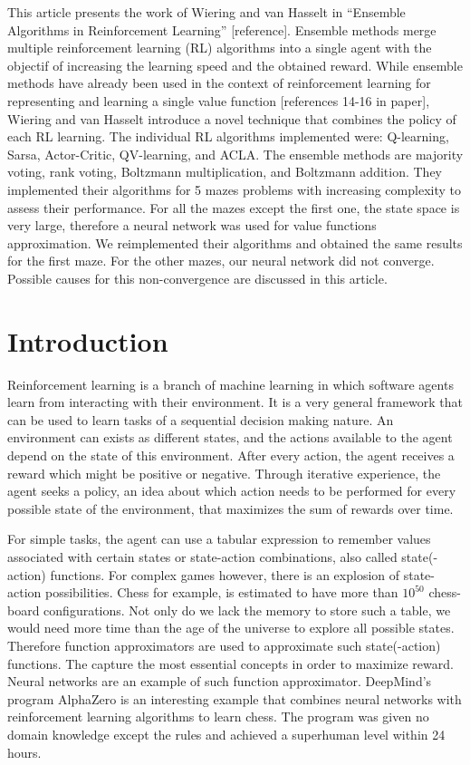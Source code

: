 This article presents the work of Wiering and van Hasselt in ``Ensemble
Algorithms in Reinforcement Learning'' {[}reference{]}. Ensemble methods
merge multiple reinforcement learning (RL) algorithms into a single
agent with the objectif of increasing the learning speed and the
obtained reward. While ensemble methods have already been used in the
context of reinforcement learning for representing and learning a single
value function {[}references 14-16 in paper{]}, Wiering and van Hasselt
introduce a novel technique that combines the policy of each RL
learning. The individual RL algorithms implemented were: Q-learning,
Sarsa, Actor-Critic, QV-learning, and ACLA. The ensemble methods are
majority voting, rank voting, Boltzmann multiplication, and Boltzmann
addition. They implemented their algorithms for 5 mazes problems with
increasing complexity to assess their performance. For all the mazes
except the first one, the state space is very large, therefore a neural
network was used for value functions approximation. We reimplemented
their algorithms and obtained the same results for the first maze. For
the other mazes, our neural network did not converge. Possible causes
for this non-convergence are discussed in this article.

\hypertarget{introduction}{%
\section{Introduction}\label{introduction}}

Reinforcement learning is a branch of machine learning in which software
agents learn from interacting with their environment. It is a very
general framework that can be used to learn tasks of a sequential
decision making nature. An environment can exists as different states,
and the actions available to the agent depend on the state of this
environment. After every action, the agent receives a reward which might
be positive or negative. Through iterative experience, the agent seeks a
policy, an idea about which action needs to be performed for every
possible state of the environment, that maximizes the sum of rewards
over time.

For simple tasks, the agent can use a tabular expression to remember
values associated with certain states or state-action combinations, also
called state(-action) functions. For complex games however, there is an
explosion of state-action possibilities. Chess for example, is estimated
to have more than \(10^{50}\) chess-board configurations. Not only do we
lack the memory to store such a table, we would need more time than the
age of the universe to explore all possible states. Therefore function
approximators are used to approximate such state(-action) functions. The
capture the most essential concepts in order to maximize reward. Neural
networks are an example of such function approximator. DeepMind's
program AlphaZero is an interesting example that combines neural
networks with reinforcement learning algorithms to learn chess. The
program was given no domain knowledge except the rules and achieved a
superhuman level within 24 hours.

